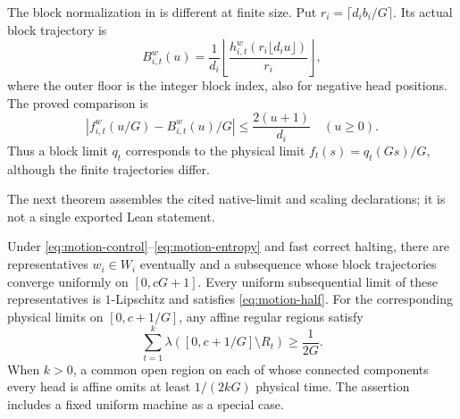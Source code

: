 The block normalization in \cite{FirstPaper2026} is different at finite size.
Put $r_i=\lceil d_i b_i/G\rceil$.  Its actual block trajectory is
\[
  B_{i,t}^{w}(u)=\frac1{d_i}
     \left\lfloor\frac{h_{i,t}^{w}(r_i\lfloor d_i u\rfloor)}{r_i}\right\rfloor,
\]
where the outer floor is the integer block index, also for negative head
positions.  The proved comparison is
\begin{equation}
\label{eq:motion-normalization-error}
 \left|f_{i,t}^{w}(u/G)-B_{i,t}^{w}(u)/G\right|
 \le \frac{2(u+1)}{d_i}\quad(u\ge0).
\end{equation}
Thus a block limit $q_t$ corresponds to the physical limit
$f_t(s)=q_t(Gs)/G$, although the finite trajectories differ.

The next theorem assembles the cited native-limit and scaling declarations;
it is not a single exported Lean statement.

\begin{theorem}
\label{thm:motion-native-limits}
Under \eqref{eq:motion-control}--\eqref{eq:motion-entropy} and fast correct
halting, there are representatives $w_i\in W_i$ eventually and a subsequence
whose block trajectories converge uniformly on $[0,cG+1]$.  Every uniform
subsequential limit of these representatives is $1$-Lipschitz and satisfies
\eqref{eq:motion-half}.  For the corresponding physical limits on
$[0,c+1/G]$, any affine regular regions satisfy
\begin{equation}
\label{eq:motion-physical-budget}
  \sum_{t=1}^k\lambda([0,c+1/G]\setminus R_t)\ge\frac1{2G}.
\end{equation}
When $k>0$, a common open region on each of whose connected components every
head is affine omits at least $1/(2kG)$ physical time.
The assertion includes a fixed uniform machine as a special case.
\end{theorem}

